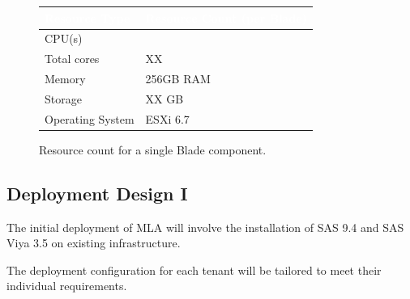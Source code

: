 \begin{figure}[H]
\begin{center}
    \renewcommand{\arraystretch}{1.5}
    \begin{tabular}{|>{\raggedright\arraybackslash}l 
                    |>{\raggedright\arraybackslash}m{3cm}
                    |}
    \hline
    \rowcolor[HTML]{196fb4}\centering\textcolor{white}{\large Resource Type} 
                            & \centering\textcolor{white}{\large Resource Count (per Blade)} 
                            \tabularnewline 
    \hline
    CPU(s)              & 12 \\\hline
    Total cores         & XX \\\hline
    Memory              & 256GB RAM \\\hline
    Storage             & XX GB \\\hline
    Operating System    & ESXi 6.7 \\\hline
    \end{tabular}
\end{center}
\caption{Resource count for a single Blade component.}
\label{BLD-RSRC}
\end{figure}



\subsection{Deployment Design I}

The initial deployment of MLA will involve the installation of SAS 9.4 and SAS Viya 3.5 on existing infrastructure. 

The deployment configuration for each tenant will be tailored to meet their individual requirements. 

